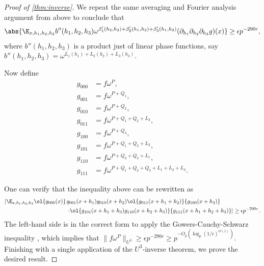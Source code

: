 \begin{proof}[Proof of \cref{thm:inverse}]
We repeat the same averaging and Fourier analysis argument from above to conclude that
\[\abs{\E_{x,h_1,h_2,h_3}b''(h_1,h_2,h_3)\omega^{\beta'_1(h_2,h_3)+\beta'_2(h_1,h_3)+\beta'_3(h_1,h_2)}(\partial_{h_1}\partial_{h_2}\partial_{h_3}g)(x)}\geq \epsilon p^{-290r},\] where $b''(h_1,h_2,h_3)$ is a product just of linear phase functions, say $b''(h_1,h_2,h_3)=\omega^{L_1(h_1)+L_2(h_2)+L_3(h_3)}$.

Now define
\begin{align*}
g_{000}&=f\omega^{P},\\
g_{001}&=f\omega^{P+Q_1},\\
g_{010}&=f\omega^{P+Q_2},\\
g_{011}&=f\omega^{P+Q_1+Q_2+L_3},\\
g_{100}&=f\omega^{P+Q_3},\\
g_{101}&=f\omega^{P+Q_1+Q_3+L_2},\\
g_{110}&=f\omega^{P+Q_2+Q_3+L_1},\\
g_{111}&=f\omega^{P+Q_1+Q_2+Q_3+L_1+L_2+L_3}.
\end{align*}

One can verify that the inequality above can be rewritten as
\[\begin{split}
\left|\E_{x,h_1,h_2,h_3}\ol{g_{000}(x)}\right.&{g_{001}(x+h_1)g_{010}(x+h_2)}\ol{g_{011}(x+h_1+h_2)}{g_{100}(x+h_3)}\\
&\left.\cdot \ol{g_{101}(x+h_1+h_3)g_{110}(x+h_2+h_3)}{g_{111}(x+h_1+h_2+h_3)}\right|\geq\epsilon p^{-290r}.
\end{split}\]
The left-hand side is in the correct form to apply the  Gowers-Cauchy-Schwarz inequality \cite[Lemma B.1.(iv)]{TZ12}, which implies that $\|f\omega^P\|_{U^3}\geq\epsilon p^{-290r}\geq p^{-O_p(\log_p(1/\epsilon)^{O(1)})}$. Finishing with a single application of the $U^3$-inverse theorem, we prove the desired result.
\end{proof}

